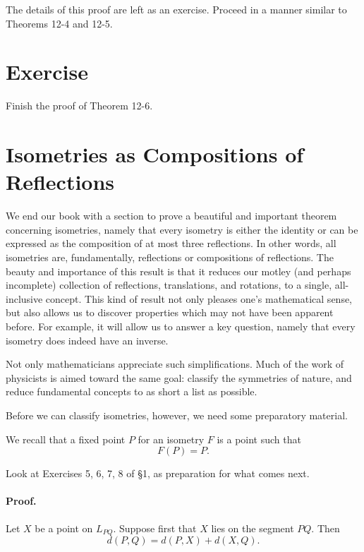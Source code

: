 \documentclass[12pt]{book} %
\begin{document}
\begin{ExerciseList}
\begin{ExerciseList}
\begin{ExerciseList}

The details of this proof are left as an exercise. Proceed in a manner
similar to Theorems 12-4 and 12-5.

\section*{Exercise}

\setcounter{Exercise}{0}
\begin{ExerciseList}
\Exercise Finish the proof of Theorem 12-6.
\end{ExerciseList}

\section{Isometries as Compositions of Reflections}

We end our book with a section to prove a beautiful and important
theorem concerning isometries, namely that every isometry is either the
identity or can be expressed as the composition of at most three reflections. In other words, all isometries are, fundamentally, reflections or
compositions of reflections. The beauty and importance of this result is
that it reduces our motley (and perhaps incomplete) collection of reflections, translations, and rotations, to a single, all-inclusive concept. This
kind of result not only pleases one's mathematical sense, but also allows
us to discover properties which may not have been apparent before. For
example, it will allow us to answer a key question, namely that every
isometry does indeed have an inverse.

Not only mathematicians appreciate such simplifications. Much of the
work of physicists is aimed toward the same goal: classify the symmetries
of nature, and reduce fundamental concepts to as short a list as possible.

Before we can classify isometries, however, we need some preparatory
material.

We recall that a fixed point $P$ for an isometry $F$ is a point such that
\[
F(P) = P.
\]

Look at Exercises 5, 6, 7, 8 of \S1, as preparation for what comes next.


\paragraph{Proof.}
Let $X$ be a point on $L_{PQ}$. Suppose first that $X$ lies on the
segment $PQ$. Then
\[
d(P,Q) = d(P,X) + d(X,Q).
\]


\end{ExerciseList}
\end{ExerciseList}
\end{ExerciseList}
\end{document}
